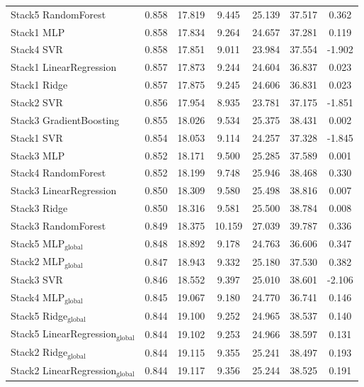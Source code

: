 \begin{table}
{\begin{tabular}{p{4.5cm}cccccc}
        Stack5 RandomForest & 0.858 & 17.819 & 9.445 & 25.139 & 37.517 & 0.362 \\
        Stack1 MLP & 0.858 & 17.834 & 9.264 & 24.657 & 37.281 & 0.119 \\
        Stack4 SVR & 0.858 & 17.851 & 9.011 & 23.984 & 37.554 & -1.902 \\
        Stack1 LinearRegression & 0.857 & 17.873 & 9.244 & 24.604 & 36.837 & 0.023 \\
        Stack1 Ridge & 0.857 & 17.875 & 9.245 & 24.606 & 36.831 & 0.023 \\
        Stack2 SVR & 0.856 & 17.954 & 8.935 & 23.781 & 37.175 & -1.851 \\
        Stack3 GradientBoosting & 0.855 & 18.026 & 9.534 & 25.375 & 38.431 & 0.002 \\
        Stack1 SVR & 0.854 & 18.053 & 9.114 & 24.257 & 37.328 & -1.845 \\
        Stack3 MLP & 0.852 & 18.171 & 9.500 & 25.285 & 37.589 & 0.001 \\
        Stack4 RandomForest & 0.852 & 18.199 & 9.748 & 25.946 & 38.468 & 0.330 \\
        Stack3 LinearRegression & 0.850 & 18.309 & 9.580 & 25.498 & 38.816 & 0.007 \\
        Stack3 Ridge & 0.850 & 18.316 & 9.581 & 25.500 & 38.784 & 0.008 \\
        Stack3 RandomForest & 0.849 & 18.375 & 10.159 & 27.039 & 39.787 & 0.336 \\
        Stack5 MLP$_{\text{global}}$ & 0.848 & 18.892 & 9.178 & 24.763 & 36.606 & 0.347 \\
        Stack2 MLP$_{\text{global}}$ & 0.847 & 18.943 & 9.332 & 25.180 & 37.530 & 0.382 \\
        Stack3 SVR & 0.846 & 18.552 & 9.397 & 25.010 & 38.601 & -2.106 \\
        Stack4 MLP$_{\text{global}}$ & 0.845 & 19.067 & 9.180 & 24.770 & 36.741 & 0.146 \\
        Stack5 Ridge$_{\text{global}}$ & 0.844 & 19.100 & 9.252 & 24.965 & 38.537 & 0.140 \\
        Stack5 LinearRegression$_{\text{global}}$ & 0.844 & 19.102 & 9.253 & 24.966 & 38.597 & 0.131 \\
        Stack2 Ridge$_{\text{global}}$ & 0.844 & 19.115 & 9.355 & 25.241 & 38.497 & 0.193 \\
        Stack2 LinearRegression$_{\text{global}}$ & 0.844 & 19.117 & 9.356 & 25.244 & 38.525 & 0.191 \\

\end{tabular}}
\end{table}
